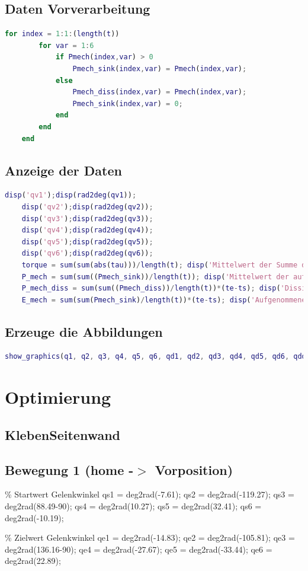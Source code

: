 \subsection{Daten Vorverarbeitung}
%
\begin{lstlisting}[language=Matlab, numbers=none]
	for index = 1:1:(length(t))
		for var = 1:6
			if Pmech(index,var) > 0
				Pmech_sink(index,var) = Pmech(index,var);
			else
				Pmech_diss(index,var) = Pmech(index,var);
				Pmech_sink(index,var) = 0;
			end
		end
	end
\end{lstlisting}
%
\subsection{Anzeige der Daten}
%
\begin{lstlisting}[language=Matlab, numbers=none]
	disp('qv1');disp(rad2deg(qv1));
	disp('qv2');disp(rad2deg(qv2));
	disp('qv3');disp(rad2deg(qv3));
	disp('qv4');disp(rad2deg(qv4));
	disp('qv5');disp(rad2deg(qv5));
	disp('qv6');disp(rad2deg(qv6));
	torque = sum(sum(abs(tau)))/length(t); disp('Mittelwert der Summe des Betrags der Getriebe-Drehmomente in Nm'); disp(torque);
	P_mech = sum(sum((Pmech_sink))/length(t)); disp('Mittelwert der aufgenommenen mechanischen Leistung in W'); disp(P_mech);
	P_mech_diss = sum(sum((Pmech_diss))/length(t))*(te-ts); disp('Dissipierte Energie in J'); disp(P_mech_diss);
	E_mech = sum(sum(Pmech_sink)/length(t))*(te-ts); disp('Aufgenommene Energie in J'); disp(E_mech);
\end{lstlisting}
%
\subsection{Erzeuge die Abbildungen}
%
\begin{lstlisting}[language=Matlab, numbers=none]
	show_graphics(q1, q2, q3, q4, q5, q6, qd1, qd2, qd3, qd4, qd5, qd6, qdd1, qdd2, qdd3, qdd4, qdd5, qdd6, t, tau, Pmech)
\end{lstlisting}
%
%
\setcounter{section}{5}
\section{Optimierung}
\label{add:optimierer}
%
\subsection{KlebenSeitenwand}
%
\subsection{Bewegung 1 (home -\ensuremath{>} Vorposition)}
%
\begin{par}
	\% Startwert Gelenkwinkel qs1 = deg2rad(-7.61); qs2 = deg2rad(-119.27); qs3 = deg2rad(88.49-90); qs4 = deg2rad(10.27); qs5 = deg2rad(32.41); qs6 = deg2rad(-10.19);
\end{par} \vspace{1em}
\begin{par}
	\% Zielwert Gelenkwinkel qe1 = deg2rad(-14.83); qe2 = deg2rad(-105.81); qe3 = deg2rad(136.16-90); qe4 = deg2rad(-27.67); qe5 = deg2rad(-33.44); qe6 = deg2rad(22.89);
\end{par} \vspace{1em}
%
